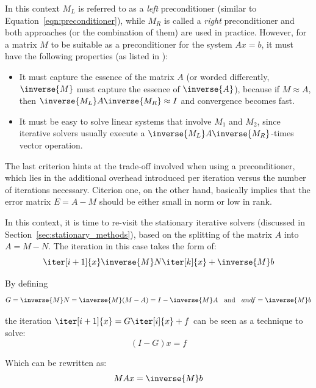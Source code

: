 \noindent In this context $M_L$ is referred to as a \textit{left} preconditioner (similar to Equation~\hyperref[eqn:preconditioner]{\ref{eqn:preconditioner}}), while $M_R$ is called a \textit{right} preconditioner and both approaches (or the combination of them) are used in practice. However, for a matrix $M$ to be suitable as a preconditioner for the system $Ax=b$, it must have the following properties (as listed in \cite{golub_matrix_2013}):
\begin{itemize}
    \item It must capture the essence of the matrix $A$ (or worded differently, $\inverse{M}$ must capture the essence of $\inverse{A}$), because if $M \approx A$, then $\inverse{M_L}A\inverse{M_R} \approx I$ and convergence becomes fast.
    \item It must be easy to solve linear systems that involve $M_1$ and $M_2$, since iterative solvers usually execute a $\inverse{M_L}A\inverse{M_R}$-times vector operation.
\end{itemize}

\noindent The last criterion hints at the trade-off involved when using a preconditioner, which lies in the additional overhead introduced per iteration versus the number of iterations necessary. Citerion one, on the other hand, basically implies that the error matrix $E=A-M$ should be either small in norm or low in rank.

In this context, it is time to re-visit the stationary iterative solvers (discussed in Section~\hyperref[sec:stationary_methods]{\ref{sec:stationary_methods}}), based on the splitting of the matrix $A$ into $A=M-N$. The iteration in this case takes the form of:
\begin{equation}
    \iter[i+1]{x}\inverse{M}N\iter[k]{x}+\inverse{M}b
\end{equation}

\noindent By defining
\begin{equation}
    G=\inverse{M}N=\inverse{M}(M-A)=I-\inverse{M}A\;\; \text{ and } \;\; and f=\inverse{M}b
\end{equation}

\noindent the iteration $\iter[i+1]{x}=G\iter[i]{x}+f$ can be seen as a technique to solve:
\begin{equation}
    (I-G)x = f
\end{equation}

\noindent Which can be rewritten as:
\begin{equation}
    {M}Ax = \inverse{M}b
\end{equation}

